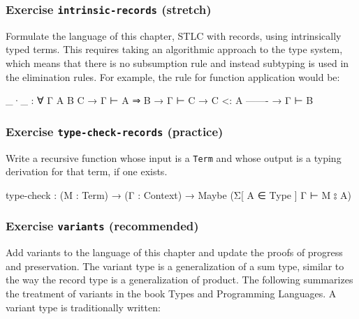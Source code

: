 \hypertarget{exercise-intrinsic-records-stretch}{%
\subsubsection{\texorpdfstring{Exercise \texttt{intrinsic-records}
(stretch)}{Exercise intrinsic-records (stretch)}}\label{exercise-intrinsic-records-stretch}}

Formulate the language of this chapter, STLC with records, using
intrinsically typed terms. This requires taking an algorithmic approach
to the type system, which means that there is no subsumption rule and
instead subtyping is used in the elimination rules. For example, the
rule for function application would be:

\begin{myDisplay}
_·_ : ∀ {Γ A B C}
  → Γ ⊢ A ⇒ B
  → Γ ⊢ C
  → C <: A
    -------
  → Γ ⊢ B
\end{myDisplay}

\hypertarget{exercise-type-check-records-practice}{%
\subsubsection{\texorpdfstring{Exercise \texttt{type-check-records}
(practice)}{Exercise type-check-records (practice)}}\label{exercise-type-check-records-practice}}

Write a recursive function whose input is a \texttt{Term} and whose
output is a typing derivation for that term, if one exists.

\begin{myDisplay}
type-check : (M : Term) → (Γ : Context) → Maybe (Σ[ A ∈ Type ] Γ ⊢ M ⦂ A)
\end{myDisplay}

\hypertarget{exercise-variants-recommended}{%
\subsubsection{\texorpdfstring{Exercise \texttt{variants}
(recommended)}{Exercise variants (recommended)}}\label{exercise-variants-recommended}}

Add variants to the language of this chapter and update the proofs of
progress and preservation. The variant type is a generalization of a sum
type, similar to the way the record type is a generalization of product.
The following summarizes the treatment of variants in the book Types and
Programming Languages. A variant type is traditionally written:

